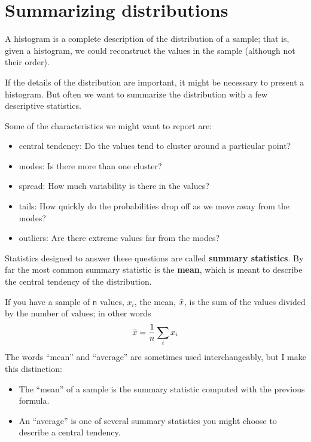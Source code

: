 \documentclass[12pt]{book}
\begin{document}
\section{Summarizing distributions}
\label{mean}

A histogram is a complete description of the distribution of a sample;
that is, given a histogram, we could reconstruct the values in the
sample (although not their order).

If the details of the distribution are important, it might be
necessary to present a histogram.  But often we want to
summarize the distribution with a few descriptive statistics.

Some of the characteristics we might want to report are:

\begin{itemize}

\item central tendency: Do the values tend to cluster around
a particular point?

\item modes: Is there more than one cluster?

\item spread: How much variability is there in the values?

\item tails: How quickly do the probabilities drop off as we
move away from the modes?

\item outliers: Are there extreme values far from the modes?

\end{itemize}

Statistics designed to answer these questions are called {\bf summary
  statistics}.  By far the most common summary statistic is the {\bf
  mean}, which is meant to describe the central tendency of the
distribution.    

If you have a sample of \verb"n" values, $x_i$, the mean, $\bar{x}$, is
the sum of the values divided by the number of values; in other words
%
\[ \bar{x} = \frac{1}{n} \sum_i x_i \]
%
The words ``mean'' and ``average'' are sometimes used interchangeably,
but I make this distinction:

\begin{itemize}

\item The ``mean'' of a sample is the summary statistic computed with
  the previous formula.

\item An ``average'' is one of several summary statistics you might
  choose to describe a central tendency.

\end{itemize}
\end{document}
